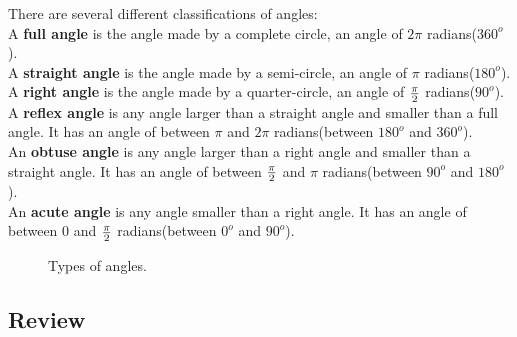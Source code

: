 There are several different classifications of angles: \\

A {\bf  full angle} is the angle made by a complete circle, an angle of $2\pi$ radians($360^o$). \\

A {\bf  straight angle} is the angle made by a semi-circle, an angle of $\pi$ radians($180^o$). \\

A {\bf right angle} is the angle made by a quarter-circle, an angle of $\frac{\pi}{2}$ radians($90^o$). \\

A {\bf reflex angle} is any angle larger than a straight angle and smaller than a full angle.  It has an angle of between $\pi$ and $2\pi$ radians(between $180^o$ and $360^o$). \\

An {\bf obtuse angle} is any angle larger than a right angle and smaller than a straight angle.  It has an angle of between $\frac{\pi}{2}$ and $\pi$ radians(between $90^o$ and $180^o$). \\

An {\bf acute angle} is any angle smaller than a right angle.  It has an angle of between $0$ and $\frac{\pi}{2}$ radians(between $0^o$ and $90^o$). \\

\begin{figure}[htb]
\center
\caption{Types of angles.}
\label{fig:types_of_angles}
\end{figure}


\newpage

\newpage
\subsection{Review}

